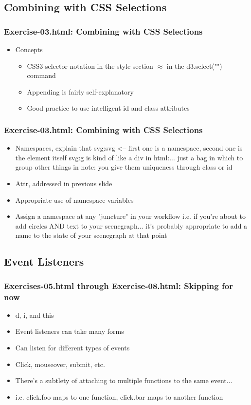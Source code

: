 \documentclass{beamer}
\begin{document}
\subsection{Combining with CSS Selections}

\begin{frame}
    \frametitle{Exercise-03.html: Combining with CSS Selections}
    \begin{itemize}
    \item Concepts
        \begin{itemize}
        \item CSS3 selector notation in the style section $\approx$ in the d3.select("") command
        \item Appending is fairly self-explanatory
        \item Good practice to use intelligent id and class attributes
        \end{itemize}
    \end{itemize}
\end{frame}


\begin{frame}
    \frametitle{Exercise-03.html: Combining with CSS Selections}
    \begin{itemize}
    \item Namespaces, explain that svg:svg <-- first one is a namespace, second one is the element itself svg:g is kind of like a div in html:... just a bag in which to group other things in note: you give them uniqueness through class or id
    \item Attr, addressed in previous slide
    \item Appropriate use of namespace variables
    \item Assign a namespace at any "juncture" in your workflow i.e. if you're about to add circles AND text to your scenegraph... it's probably appropriate to add a name to the state of your scenegraph at that point
    \end{itemize}
\end{frame}



\subsection{Event Listeners}

\begin{frame}
    \frametitle{Exercises-05.html through Exercise-08.html: Skipping for now}
    \begin{itemize}
    \item d, i, and this
    \item Event listeners can take many forms
    \item Can listen for different types of events
    \item Click, mouseover, submit, etc.
    \item There's a subtlety of attaching to multiple functions to the same event...
    \item i.e. click.foo maps to one function, click.bar maps to another function
    \end{itemize}
\end{frame}
\end{document}
